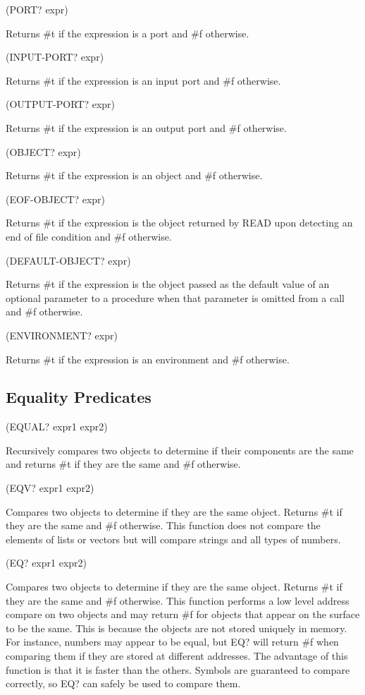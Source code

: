 \documentclass[11pt]{article}
\begin{document}
(PORT? expr)

Returns \#t if the expression is a port and \#f otherwise.

(INPUT-PORT? expr)

Returns \#t if the expression is an input port and \#f otherwise.

(OUTPUT-PORT? expr)

Returns \#t if the expression is an output port and \#f otherwise.

(OBJECT? expr)

Returns \#t if the expression is an object and \#f otherwise.

(EOF-OBJECT? expr)

Returns \#t if the expression is the object returned by READ upon
detecting an end of file condition and \#f otherwise.

(DEFAULT-OBJECT? expr)

Returns \#t if the expression is the object passed as the default value
of an optional parameter to a procedure when that parameter is omitted
from a call and \#f otherwise.

(ENVIRONMENT? expr)

Returns \#t if the expression is an environment and \#f otherwise.
\subsection{Equality Predicates}
\label{sec-1-26}

(EQUAL? expr1 expr2)

Recursively compares two objects to determine if their components are
the same and returns \#t if they are the same and \#f otherwise.

(EQV? expr1 expr2)

Compares two objects to determine if they are the same
object. Returns \#t if they are the same and \#f otherwise. This function
does not compare the elements of lists or vectors but will compare
strings and all types of numbers.

(EQ? expr1 expr2)

Compares two objects to determine if they are the same
object. Returns \#t if they are the same and \#f otherwise. This function
performs a low level address compare on two objects and may return \#f
for objects that appear on the surface to be the same. This is because
the objects are not stored uniquely in memory. For instance, numbers may
appear to be equal, but EQ? will return \#f when comparing them if they
are stored at different addresses. The advantage of this function is
that it is faster than the others. Symbols are guaranteed to compare
correctly, so EQ? can safely be used to compare them.
\end{document}
